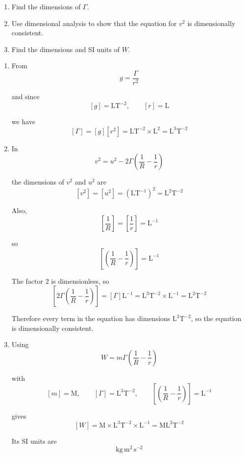 \documentclass[leqno]{article}
\begin{document}
\begin{enumerate}[
  label=\textbf{\arabic*.},
  leftmargin=*,
  topsep=0pt,
  partopsep=0pt,
  parsep=0pt
]
\begin{enumerate}[label=\textbf{(\alph*)}]
  \item Find the dimensions of $\Gamma$. 
  \item Use dimensional analysis to show that the equation for $v^2$ is dimensionally consistent. 
  \item Find the dimensions and SI units of $W$. 
\end{enumerate}

\vspace*{20pt}

\begin{djsSolution}
\begin{enumerate}[label=\textbf{(\alph*)}, start=1]
  \item From
  \[
  g=\frac{\Gamma}{r^2}
  \]

  and since
  \[
  [g]=\mathrm{LT^{-2}},\qquad [r]=\mathrm{L}
  \]

  we have
  \[
  [\Gamma]=[g][r^2]=\mathrm{LT^{-2}}\times\mathrm{L^2}=\mathrm{L^3T^{-2}}
  \]

  \item In
  \[
  v^2=u^2-2\Gamma\left(\frac{1}{R}-\frac{1}{r}\right)
  \]

  the dimensions of \(v^2\) and \(u^2\) are
  \[
  [v^2]=[u^2]=(\mathrm{LT^{-1}})^2=\mathrm{L^2T^{-2}}
  \]

  Also,
  \[
  \left[\frac{1}{R}\right]=\left[\frac{1}{r}\right]=\mathrm{L^{-1}}
  \]

  so
  \[
  \left[\left(\frac{1}{R}-\frac{1}{r}\right)\right]=\mathrm{L^{-1}}
  \]

  The factor \(2\) is dimensionless, so
  \[
  \left[2\Gamma\left(\frac{1}{R}-\frac{1}{r}\right)\right]=[\Gamma]\mathrm{L^{-1}}=\mathrm{L^3T^{-2}}\times\mathrm{L^{-1}}=\mathrm{L^2T^{-2}}
  \]

  Therefore every term in the equation has dimensions \(\mathrm{L^2T^{-2}}\), so the equation is dimensionally consistent.

  \item Using
  \[
  W=m\Gamma\left(\frac{1}{R}-\frac{1}{r}\right)
  \]

  with
  \[
  [m]=\mathrm{M},\qquad [\Gamma]=\mathrm{L^3T^{-2}},\qquad \left[\left(\frac{1}{R}-\frac{1}{r}\right)\right]=\mathrm{L^{-1}}
  \]

  gives
  \[
  [W]=\mathrm{M}\times\mathrm{L^3T^{-2}}\times\mathrm{L^{-1}}=\mathrm{ML^2T^{-2}}
  \]

  Its SI units are
  \[
  \mathrm{kg\,m^2\,s^{-2}}
  \]


\end{enumerate}
\end{djsSolution}
\end{enumerate}
\end{document}

